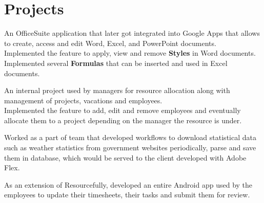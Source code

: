 \documentclass[a4paper]{srika-resume} %
\begin{document}
\begin{minipage}[t]{0.64\textwidth}
\sectionspace %


\section{Projects}


An OfficeSuite application that later got integrated into Google Apps that allows to
create, access and edit Word, Excel, and PowerPoint documents.\\
Implemented the feature to apply, view and remove \textbf{Styles} in Word documents. \\
Implemented several \textbf{Formulas} that can be inserted and used in Excel documents.

\sectionspace %



An internal project used by managers for resource allocation along with management of projects, vacations and employees.  \\
Implemented the feature to add, edit and remove employees and eventually allocate them to a project depending on the manager the resource is under.

\sectionspace %



Worked as a part of team that developed workflows to download statistical data such as weather statistics from government websites periodically, parse and save them in database, which would be served to the client developed with Adobe Flex. 

\sectionspace %



As an extension of Resourcefully, developed an entire Android app used by the employees to update their timesheets, their tasks and submit them for review. 


\end{minipage}
\end{document}
